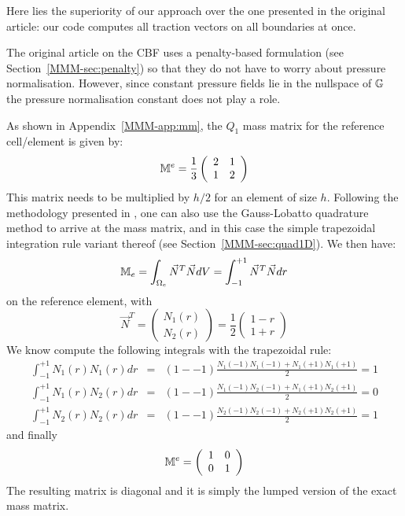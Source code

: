 Here lies the superiority of our approach over the one presented in the original article: 
our code computes all traction vectors on all boundaries at once.




\begin{remark}
The original article on the CBF \cite{zhgh93} uses a penalty-based formulation 
(see Section~\ref{MMM-sec:penalty})
so that they do not have to worry about pressure normalisation. However, since constant pressure fields lie 
in the nullspace of ${\mathbb{G}}$ the pressure normalisation constant does not play a role.
\end{remark}

As shown in Appendix~\ref{MMM-app:mm}, the $Q_1$ mass matrix for the reference cell/element is given by:
\[
{{\mathbb{M}}}^e=
\frac{1}{3}
\left(
\begin{array}{cc}
2 & 1 \\ 1 & 2
\end{array}
\right)
\]
This matrix needs to be multiplied by $h/2$ for an element of size $h$.
Following the methodology presented in \cite{zhgh93}, one can also use the Gauss-Lobatto 
quadrature method to arrive at the mass matrix, and in this case the simple trapezoidal 
integration rule variant thereof (see Section~\ref{MMM-sec:quad1D}).
We then have:
\begin{equation}
{{\mathbb{M}}}_e=\int_{\Omega_e} \vec{N}^T \vec{N} dV
= \int_{-1}^{+1} \vec{N}^T \vec{N} dr
\end{equation}
on the reference element, with 
\[
{\vec N}^T = 
\left(
\begin{array}{c}
N_1(r) \\ N_2(r)
\end{array}
\right)
=
\frac{1}{2}
\left(
\begin{array}{c}
1-r \\ 1+r
\end{array}
\right)
\]
We know compute the following integrals with the trapezoidal rule:
\begin{eqnarray}
\int_{-1}^{+1} N_1(r) N_1(r) dr &=& (1--1) \frac{N_1(-1) N_1(-1)  + N_1(+1) N_1(+1) }{2} = 1 \\
\int_{-1}^{+1} N_1(r) N_2(r) dr &=& (1--1) \frac{N_1(-1) N_2(-1)  + N_1(+1) N_2(+1) }{2} = 0 \\
\int_{-1}^{+1} N_2(r) N_2(r) dr &=& (1--1) \frac{N_2(-1) N_2(-1)  + N_2(+1) N_2(+1) }{2} = 1 
\end{eqnarray}
and finally 
\[
{{\mathbb{M}}}^e=
\left(
\begin{array}{cc}
1 & 0 \\ 0 & 1
\end{array}
\right)
\]
The resulting matrix is diagonal and it is simply the lumped version of the exact mass matrix. 





